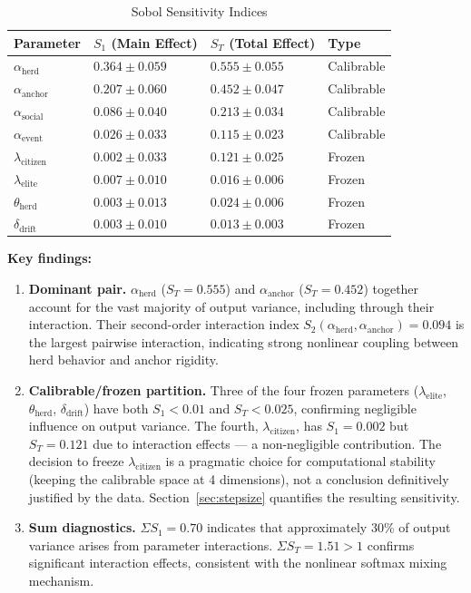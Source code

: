 \documentclass[12pt]{article}
\begin{document}
\begin{table}[H]
\centering
\caption{Sobol Sensitivity Indices}
\label{tab:sobol}
\begin{tabular}{llll}
\toprule
Parameter & $S_1$ (Main Effect) & $S_T$ (Total Effect) & Type \\
\midrule
$\alpha_{\text{herd}}$ & $0.364 \pm 0.059$ & $0.555 \pm 0.055$ & Calibrable \\
$\alpha_{\text{anchor}}$ & $0.207 \pm 0.060$ & $0.452 \pm 0.047$ & Calibrable \\
$\alpha_{\text{social}}$ & $0.086 \pm 0.040$ & $0.213 \pm 0.034$ & Calibrable \\
$\alpha_{\text{event}}$ & $0.026 \pm 0.033$ & $0.115 \pm 0.023$ & Calibrable \\
$\lambda_{\text{citizen}}$ & $0.002 \pm 0.033$ & $0.121 \pm 0.025$ & Frozen \\
$\lambda_{\text{elite}}$ & $0.007 \pm 0.010$ & $0.016 \pm 0.006$ & Frozen \\
$\theta_{\text{herd}}$ & $0.003 \pm 0.013$ & $0.024 \pm 0.006$ & Frozen \\
$\delta_{\text{drift}}$ & $0.003 \pm 0.010$ & $0.013 \pm 0.003$ & Frozen \\
\bottomrule
\end{tabular}
\end{table}

\textbf{Key findings:}

\begin{enumerate}
    \item \textbf{Dominant pair.} $\alpha_{\text{herd}}$ ($S_T = 0.555$) and $\alpha_{\text{anchor}}$ ($S_T = 0.452$) together account for the vast majority of output variance, including through their interaction. Their second-order interaction index $S_2(\alpha_{\text{herd}}, \alpha_{\text{anchor}}) = 0.094$ is the largest pairwise interaction, indicating strong nonlinear coupling between herd behavior and anchor rigidity.

    \item \textbf{Calibrable/frozen partition.} Three of the four frozen parameters ($\lambda_{\text{elite}}$, $\theta_{\text{herd}}$, $\delta_{\text{drift}}$) have both $S_1 < 0.01$ and $S_T < 0.025$, confirming negligible influence on output variance. The fourth, $\lambda_{\text{citizen}}$, has $S_1 = 0.002$ but $S_T = 0.121$ due to interaction effects --- a non-negligible contribution. The decision to freeze $\lambda_{\text{citizen}}$ is a pragmatic choice for computational stability (keeping the calibrable space at 4 dimensions), not a conclusion definitively justified by the data. Section~\ref{sec:stepsize} quantifies the resulting sensitivity.

    \item \textbf{Sum diagnostics.} $\Sigma S_1 = 0.70$ indicates that approximately 30\% of output variance arises from parameter interactions. $\Sigma S_T = 1.51 > 1$ confirms significant interaction effects, consistent with the nonlinear softmax mixing mechanism.
\end{enumerate}
\end{document}
